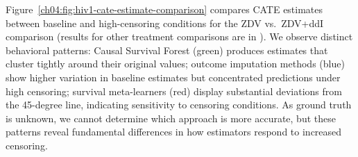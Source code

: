 Figure~\ref{ch04:fig:hiv1-cate-estimate-comparison} compares CATE estimates between baseline and high-censoring conditions for the ZDV vs.~ZDV+ddI comparison (results for other treatment comparisons are in \citet[Appendix H.2, Figures 22--23]{noroozizadeh2026survhte}).
We observe distinct behavioral patterns: Causal Survival Forest (green) produces estimates that cluster tightly around their original values; outcome imputation methods (blue) show higher variation in baseline estimates but concentrated predictions under high censoring; survival meta-learners (red) display substantial deviations from the 45-degree line, indicating sensitivity to censoring conditions.
As ground truth is unknown, we cannot determine which approach is more accurate, but these patterns reveal fundamental differences in how estimators respond to increased censoring.


